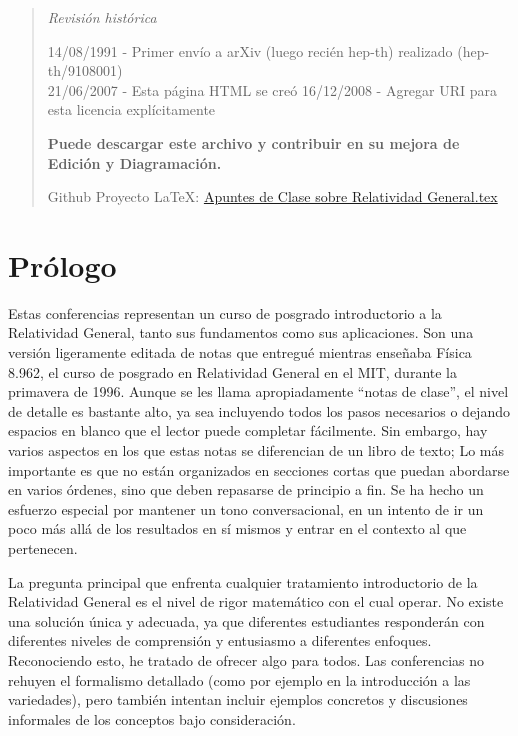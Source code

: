 \documentclass[11pt,b5paper,openany,twoside]{book}
\begin{document}
\begin{quote}
{\textit{Revisión histórica}

14/08/1991 - Primer envío a arXiv (luego recién hep-th) realizado (hep-th/9108001)\\
21/06/2007 - Esta página HTML se creó 16/12/2008 - Agregar URI para esta licencia explícitamente
}

\textbf{Puede descargar este archivo y contribuir en su mejora de Edición y Diagramación. }

Github Proyecto LaTeX: \href{https://github.com/quiscka/Apuntes-de-Clase-sobre-Relatividad-General/blob/main/Apuntes%20de%20Clase%20Sobre%20Relatividad%20General%20-%20Sean%20M.%20Carroll%20(1997).tex}{Apuntes de Clase sobre Relatividad General.tex}
\end{quote}



{\normalfont\fontsize{9.4pt}{1em}\selectfont
    \thispagestyle{plain}
    \begin{quote}
        \tableofcontents
        \thispagestyle{plain}
    \end{quote}
    \normalfont\selectfont}


\mainmatter


\chapter*{Prólogo}

Estas conferencias representan un curso de posgrado introductorio a la Relatividad General, tanto sus fundamentos como sus aplicaciones.
Son una versión ligeramente editada de notas que entregué mientras enseñaba Física 8.962, el curso de posgrado en Relatividad General en el MIT, durante la primavera de 1996.
Aunque se les llama apropiadamente ``notas de clase'', el nivel de detalle es bastante alto, ya sea incluyendo todos los pasos necesarios o dejando espacios en blanco que el lector puede completar fácilmente.
Sin embargo, hay varios aspectos en los que estas notas se diferencian de un libro de texto; Lo más importante es que no están organizados en secciones cortas que puedan abordarse en varios órdenes, sino que deben repasarse de principio a fin.
Se ha hecho un esfuerzo especial por mantener un tono conversacional, en un intento de ir un poco más allá de los resultados en sí mismos y entrar en el contexto al que pertenecen.

La pregunta principal que enfrenta cualquier tratamiento introductorio de la Relatividad General es el nivel de rigor matemático con el cual operar.
No existe una solución única y adecuada, ya que diferentes estudiantes responderán con diferentes niveles de comprensión y entusiasmo a diferentes enfoques.
Reconociendo esto, he tratado de ofrecer algo para todos.
Las conferencias no rehuyen el formalismo detallado (como por ejemplo en la introducción a las variedades), pero también intentan incluir ejemplos concretos y discusiones informales de los conceptos bajo consideración.
\end{document}
